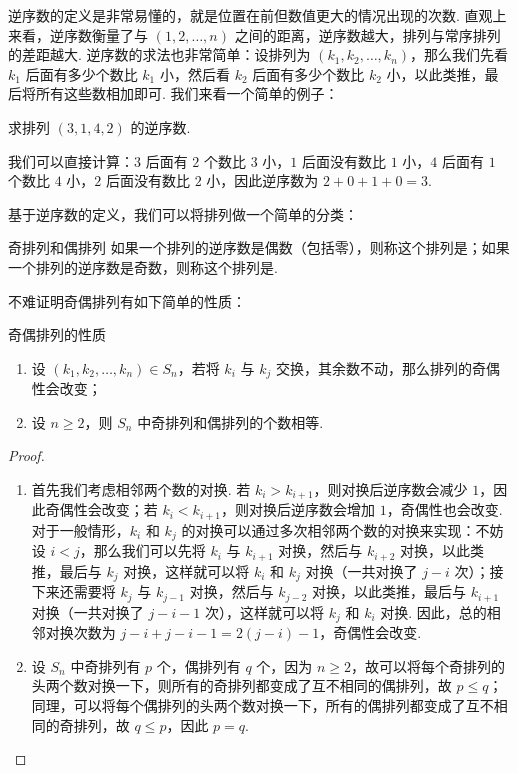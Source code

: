 逆序数的定义是非常易懂的，就是位置在前但数值更大的情况出现的次数. 直观上来看，逆序数衡量了与 $(1,2,\ldots,n)$ 之间的距离，逆序数越大，排列与常序排列的差距越大. 逆序数的求法也非常简单：设排列为 $(k_1,k_2,\ldots,k_n)$，那么我们先看 $k_1$ 后面有多少个数比 $k_1$ 小，然后看 $k_2$ 后面有多少个数比 $k_2$ 小，以此类推，最后将所有这些数相加即可. 我们来看一个简单的例子：

\begin{example}{}{}
    求排列 $(3,1,4,2)$ 的逆序数.
\end{example}

\begin{solution}
    我们可以直接计算：$3$ 后面有 $2$ 个数比 $3$ 小，$1$ 后面没有数比 $1$ 小，$4$ 后面有 $1$ 个数比 $4$ 小，$2$ 后面没有数比 $2$ 小，因此逆序数为 $2+0+1+0=3$.
\end{solution}

基于逆序数的定义，我们可以将排列做一个简单的分类：

\begin{definition}{奇排列和偶排列}{}
    如果一个排列的逆序数是偶数（包括零），则称这个排列是；如果一个排列的逆序数是奇数，则称这个排列是.
\end{definition}

不难证明奇偶排列有如下简单的性质：
\begin{example}{奇偶排列的性质}{}
    \begin{enumerate}
        \item 设 $(k_1,k_2,\ldots,k_n) \in S_n$，若将 $k_i$ 与 $k_j$ 交换，其余数不动，那么排列的奇偶性会改变；
        \item 设 $n \geqslant 2$，则 $S_n$ 中奇排列和偶排列的个数相等.
    \end{enumerate}
\end{example}

\begin{proof}
    \begin{enumerate}
        \item 首先我们考虑相邻两个数的对换. 若 $k_i > k_{i+1}$，则对换后逆序数会减少 $1$，因此奇偶性会改变；若 $k_i < k_{i+1}$，则对换后逆序数会增加 $1$，奇偶性也会改变. 对于一般情形，$k_i$ 和 $k_j$ 的对换可以通过多次相邻两个数的对换来实现：不妨设 $i < j$，那么我们可以先将 $k_i$ 与 $k_{i+1}$ 对换，然后与 $k_{i+2}$ 对换，以此类推，最后与 $k_j$ 对换，这样就可以将 $k_i$ 和 $k_j$ 对换（一共对换了 $j-i$ 次）；接下来还需要将 $k_j$ 与 $k_{j-1}$ 对换，然后与 $k_{j-2}$ 对换，以此类推，最后与 $k_{i+1}$ 对换（一共对换了 $j-i-1$ 次），这样就可以将 $k_j$ 和 $k_i$ 对换. 因此，总的相邻对换次数为 $j-i+j-i-1=2(j-i)-1$，奇偶性会改变.
        \item 设 $S_n$ 中奇排列有 $p$ 个，偶排列有 $q$ 个，因为 $n \geqslant 2$，故可以将每个奇排列的头两个数对换一下，则所有的奇排列都变成了互不相同的偶排列，故 $p \leqslant q$；同理，可以将每个偶排列的头两个数对换一下，所有的偶排列都变成了互不相同的奇排列，故 $q \leqslant p$，因此 $p = q$.
    \end{enumerate}
\end{proof}

